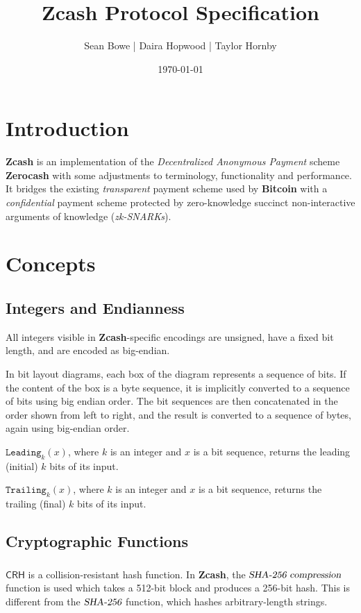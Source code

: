 \documentclass[8pt]{article}
\newcommand{\term}[1]{\textsl{#1}\xspace}
\newcommand{\termbf}[1]{\textbf{#1}\xspace}
\newcommand{\Zcash}{\termbf{Zcash}}
\newcommand{\Zerocash}{\termbf{Zerocash}}
\newcommand{\Bitcoin}{\termbf{Bitcoin}}
\newcommand{\zkSNARKs}{\term{zk-SNARKs}}
\newcommand{\CRH}{\mathsf{CRH}}
\newcommand{\SHAName}{\term{SHA-256 compression}}
\newcommand{\SHAOrig}{\term{SHA-256}}
\newcommand{\Leading}[1]{\mathtt{Leading}_{#1}}
\newcommand{\Trailing}[1]{\mathtt{Trailing}_{#1}}
\begin{document}
\title{Zcash Protocol Specification}
\author{Sean Bowe | Daira Hopwood | Taylor Hornby}
\date{\today}
\maketitle
\section{Introduction}

\Zcash is an implementation of the \term{Decentralized Anonymous Payment}
scheme \Zerocash \cite{ZerocashOakland} with some adjustments to terminology,
functionality and performance. It bridges the existing \emph{transparent}
payment scheme used by \Bitcoin with a \emph{confidential} payment scheme
protected by zero-knowledge succinct non-interactive arguments of knowledge
(\zkSNARKs).

\section{Concepts}

\subsection{Integers and Endianness}

All integers visible in \Zcash-specific encodings are unsigned, have a fixed
bit length, and are encoded as big-endian.

In bit layout diagrams, each box of the diagram represents a sequence of bits.
If the content of the box is a byte sequence, it is implicitly converted to
a sequence of bits using big endian order. The bit sequences are then
concatenated in the order shown from left to right, and the result is converted
to a sequence of bytes, again using big-endian order.

$\Leading{k}(x)$, where $k$ is an integer and $x$ is a bit sequence, returns
the leading (initial) $k$ bits of its input.

$\Trailing{k}(x)$, where $k$ is an integer and $x$ is a bit sequence, returns
the trailing (final) $k$ bits of its input.

\subsection{Cryptographic Functions}

\subparagraph{}

$\CRH$ is a collision-resistant hash function. In \Zcash, the $\SHAName$ function
is used which takes a 512-bit block and produces a 256-bit hash. This is
different from the $\SHAOrig$ function, which hashes arbitrary-length strings.
\end{document}
